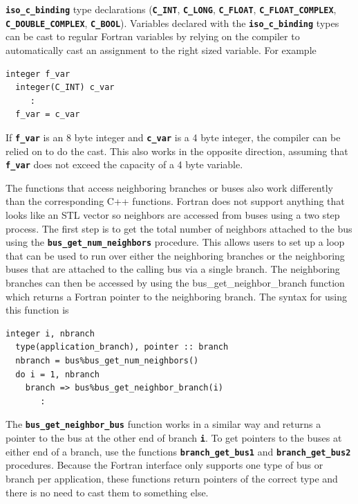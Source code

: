 \documentclass[12pt]{report} %
\begin{document}
 \texttt{\textbf{iso\_c\_binding}} type declarations (\texttt{\textbf{C\_INT}}, \texttt{\textbf{C\_LONG}}, \texttt{\textbf{C\_FLOAT}}, \texttt{\textbf{C\_FLOAT\_COMPLEX}}, \texttt{\textbf{C\_DOUBLE\_COMPLEX}}, \texttt{\textbf{C\_BOOL}}). Variables declared with the \texttt{\textbf{iso\_c\_binding}} types can be cast to regular Fortran variables by relying on the compiler to automatically cast an assignment to the right sized variable. For example

{
\color{red}
\begin{Verbatim}[fontseries=b]
  integer f_var
  integer(C_INT) c_var
     :
  f_var = c_var
\end{Verbatim}
}

If \texttt{\textbf{f\_var}} is an 8 byte integer and \texttt{\textbf{c\_var}} is a 4 byte integer, the compiler can be relied on to do the cast. This also works in the opposite direction, assuming that \texttt{\textbf{f\_var}} does not exceed the capacity of a 4 byte variable.

The functions that access neighboring branches or buses also work differently than the corresponding C++ functions. Fortran does not support anything that looks like an STL vector so neighbors are accessed from buses using a two step process. The first step is to get the total number of neighbors attached to the bus using the \texttt{\textbf{bus\_get\_num\_neighbors}} procedure. This allows users to set up a loop that can be used to run over either the neighboring branches or the neighboring buses that are attached to the calling bus via a single branch. The neighboring branches can then be accessed by using the bus\_get\_neighbor\_branch function which returns a Fortran pointer to the neighboring branch. The syntax for using this function is

{
\color{red}
\begin{Verbatim}[fontseries=b]
  integer i, nbranch
  type(application_branch), pointer :: branch
  nbranch = bus%bus_get_num_neighbors()
  do i = 1, nbranch
    branch => bus%bus_get_neighbor_branch(i)
       :
\end{Verbatim}
}

The \texttt{\textbf{bus\_get\_neighbor\_bus}} function works in a similar way and returns a pointer to the bus at the other end of branch \texttt{\textbf{i}}. To get pointers to the buses at either end of a branch, use the functions \texttt{\textbf{branch\_get\_bus1}} and \texttt{\textbf{branch\_get\_bus2}} procedures. Because the Fortran interface only supports one type of bus or branch per application, these functions return pointers of the correct type and there is no need to cast them to something else.
\end{document}
